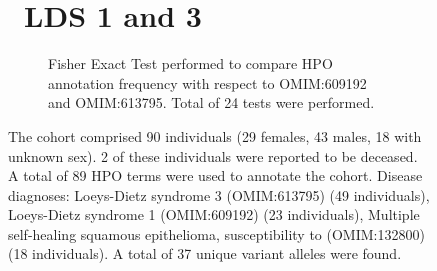 \begin{figure}[htbp]
\section*{ LDS 1 and 3}
\centering
\begin{subfigure}[b]{0.95\textwidth}
\centering
{}
\captionsetup{justification=raggedright,singlelinecheck=false}
\caption{
Fisher Exact Test performed to compare HPO annotation frequency with respect to OMIM:609192 and OMIM:613795. Total of
24 tests were performed.
}
\end{subfigure}
\vspace{2em}
\caption{ The cohort comprised 90 individuals (29 females, 43 males, 18 with unknown sex). 2 of these individuals were reported to be deceased. A total of 89 HPO terms were used to annotate the cohort. Disease diagnoses: Loeys-Dietz syndrome 3 (OMIM:613795) (49 individuals), Loeys-Dietz syndrome 1 (OMIM:609192) (23 individuals), Multiple self-healing squamous epithelioma, susceptibility to (OMIM:132800) (18 individuals). A total of 37 unique variant alleles were found.}
\end{figure}

